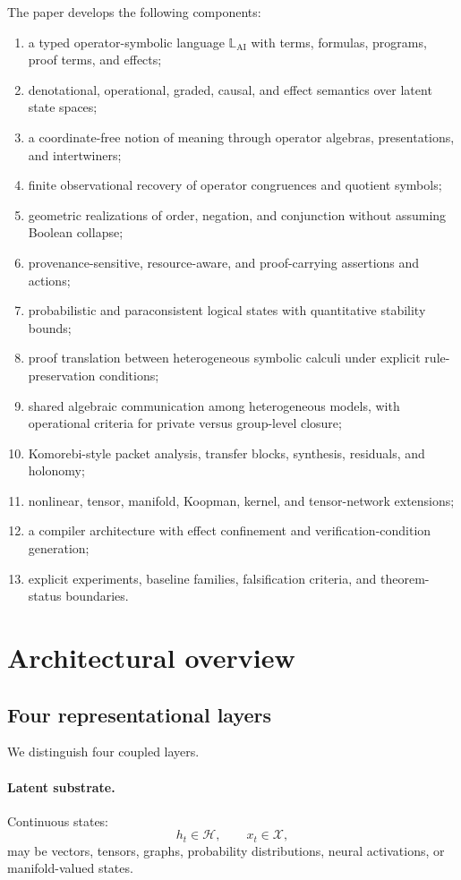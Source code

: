 \documentclass[11pt]{article}
\theoremstyle{definition}
\theoremstyle{remark}
\newcommand{\LangAI}{\mathbb L_{\mathrm{AI}}}
\newcommand{\Lat}{\mathcal H}
\newcommand{\CausalState}{\mathcal X}
\begin{document}
The paper develops the following components:
\begin{enumerate}[leftmargin=1.7em]
  \item a typed operator-symbolic language \(\LangAI\) with terms, formulas, programs, proof terms, and effects;
  \item denotational, operational, graded, causal, and effect semantics over latent state spaces;
  \item a coordinate-free notion of meaning through operator algebras, presentations, and intertwiners;
  \item finite observational recovery of operator congruences and quotient symbols;
  \item geometric realizations of order, negation, and conjunction without assuming Boolean collapse;
  \item provenance-sensitive, resource-aware, and proof-carrying assertions and actions;
  \item probabilistic and paraconsistent logical states with quantitative stability bounds;
  \item proof translation between heterogeneous symbolic calculi under explicit rule-preservation conditions;
  \item shared algebraic communication among heterogeneous models, with operational criteria for private versus group-level closure;
  \item Komorebi-style packet analysis, transfer blocks, synthesis, residuals, and holonomy;
  \item nonlinear, tensor, manifold, Koopman, kernel, and tensor-network extensions;
  \item a compiler architecture with effect confinement and verification-condition generation;
  \item explicit experiments, baseline families, falsification criteria, and theorem-status boundaries.
\end{enumerate}

\section{Architectural overview}

\subsection{Four representational layers}

We distinguish four coupled layers.

\paragraph{Latent substrate.}
Continuous states:
\[
h_t\in\Lat,
\qquad
x_t\in\CausalState,
\]
may be vectors, tensors, graphs, probability distributions, neural activations, or manifold-valued states.
\end{document}
